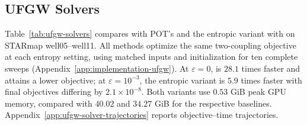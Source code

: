 \subsection{UFGW Solvers}
\label{sec:ufgw-experiments}

Table~\ref{tab:ufgw-solvers} compares \oursufgw with POT's \bcdmm and the entropic variant \ourssinkhornufgw with \bcdsinkhorn on STARmap well05--well11.
All methods optimize the same two-coupling objective \ufgwobj at each entropy setting, using matched inputs and initialization for ten complete sweeps (Appendix~\ref{app:implementation-ufgw}).
At $\varepsilon=0$, \oursufgw is $28.1$ times faster and attains a lower objective; at $\varepsilon=10^{-3}$, the entropic variant is $5.9$ times faster with final objectives differing by $2.1\times10^{-8}$.
Both variants use $0.53$ GiB peak GPU memory, compared with $40.02$ and $34.27$ GiB for the respective baselines.
Appendix~\ref{app:ufgw-solver-trajectories} reports objective--time trajectories.


